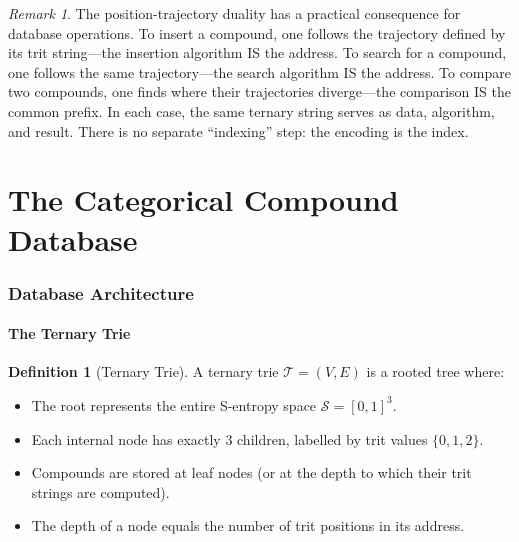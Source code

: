 \documentclass[11pt,a4paper]{article}
\theoremstyle{definition}
\newtheorem{definition}[theorem]{Definition}
\theoremstyle{remark}
\newtheorem{remark}[theorem]{Remark}
\newcommand{\Sspace}{\mathcal{S}}
\newcommand{\Trie}{\mathcal{T}}
\begin{document}
\begin{remark}
The position-trajectory duality has a practical consequence for database operations. To insert a compound, one follows the trajectory defined by its trit string---the insertion algorithm IS the address. To search for a compound, one follows the same trajectory---the search algorithm IS the address. To compare two compounds, one finds where their trajectories diverge---the comparison IS the common prefix. In each case, the same ternary string serves as data, algorithm, and result. There is no separate ``indexing'' step: the encoding is the index.
\end{remark}


\part{The Categorical Compound Database}

\section{Database Architecture}
\label{sec:architecture}

\subsection{The Ternary Trie}

\begin{definition}[Ternary Trie]
\label{def:trie}
A ternary trie $\Trie = (V, E)$ is a rooted tree where:
\begin{itemize}[nosep]
\item The root represents the entire S-entropy space $\Sspace = [0,1]^3$.
\item Each internal node has exactly 3 children, labelled by trit values $\{0, 1, 2\}$.
\item Compounds are stored at leaf nodes (or at the depth to which their trit strings are computed).
\item The depth of a node equals the number of trit positions in its address.
\end{itemize}
\end{definition}
\end{document}
